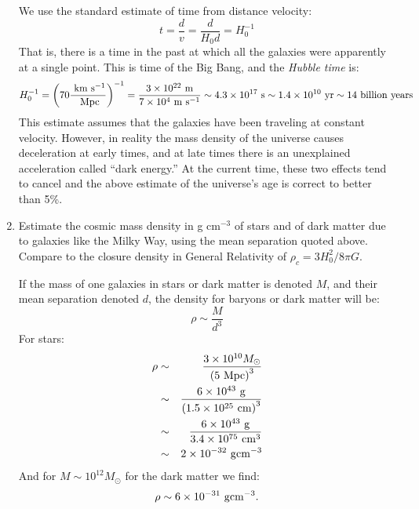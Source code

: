 \begin{enumerate}
  \begin{answer}
    We use the standard estimate of time from distance velocity:
    \begin{equation}
      t = \frac{d}{v} = \frac{d}{H_0 d} = H_0^{-1}
    \end{equation}
    That is, there is a time in the past at which all the galaxies
    were apparently at a single point. This is time of the Big Bang,
    and the {\it Hubble time} is:
    \begin{equation}
      H_0^{-1} = \left(70 \frac{{\rm ~km} {\rm ~s}^{-1}}{{\rm
          ~Mpc}}\right)^{-1} =  \frac{3 \times 10^{22} {\rm ~m}}{7
        \times 10^4 {\rm ~m} {\rm ~s}^{-1}} \sim 4.3 \times 10^{17}
      {\rm ~s} \sim 1.4 \times 10^{10} {\rm ~yr} \sim 14 {\rm
        ~billion~years}
    \end{equation}
    This estimate assumes that the galaxies have been traveling at
    constant velocity. However, in reality the mass density of the
    universe causes deceleration at early times, and at late times
    there is an unexplained acceleration called ``dark energy.'' At
    the current time, these two effects tend to cancel and the above
    estimate of the universe's age is correct to better than 5\%.
  \end{answer}
\item Estimate the cosmic mass density in g cm$^{-3}$ of stars and of dark matter
    due to galaxies like the Milky Way, using the mean separation
    quoted above. Compare to the closure density in General Relativity
    of $\rho_c = 3H_0^2 / 8\pi G$.

    \begin{answer} If the mass of one galaxies in stars or dark
    matter is denoted $M$, and their mean separation denoted $d$, the
    density for baryons or dark matter will be:
    \begin{equation}
    \rho \sim \frac{M}{d^3}
    \end{equation}
    For stars:
    \begin{eqnarray}
    \rho
    &\sim& \frac{3 \times 10^{10} M_\odot}{\left(5 {\rm
    ~Mpc}\right)^3} \cr
    &\sim& \frac{6 \times 10^{43} {\rm ~g}}{\left(1.5 \times 10^{25} {\rm ~cm}\right)^3} \cr
    &\sim& \frac{6 \times 10^{43} {\rm ~g}}{3.4 \times 10^{75} {\rm
    ~cm}^3} \cr
    &\sim& 2 \times 10^{-32} {\rm ~g} {\rm cm}^{-3}
    \end{eqnarray}
    And for $M\sim 10^{12} M_\odot$ for the dark matter we find:
    \begin{equation}
    \rho \sim 6 \times 10^{-31} {\rm ~g} {\rm cm}^{-3}.
    \end{equation}


\end{answer}
\end{enumerate}
